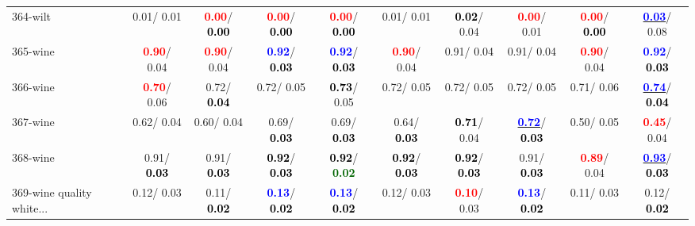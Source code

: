 \begin{table}[h]
\begin{center}
{\begin{tabular}{lc|c|c|c|c|c|c|c|c}
364-wilt &   0.01/  0.01 & \textcolor{red}{\textbf{  0.00}}/\textcolor{black}{\textbf{  0.00}} & \textcolor{red}{\textbf{  0.00}}/\textcolor{black}{\textbf{  0.00}} & \textcolor{red}{\textbf{  0.00}}/\textcolor{black}{\textbf{  0.00}} &   0.01/  0.01 & \textcolor{black}{\textbf{  0.02}}/  0.04 & \textcolor{red}{\textbf{  0.00}}/  0.01 & \textcolor{red}{\textbf{  0.00}}/\textcolor{black}{\textbf{  0.00}} & \underline{\textcolor{blue}{\textbf{  0.03}}}/  0.08 \\
365-wine & \textcolor{red}{\textbf{  0.90}}/  0.04 & \textcolor{red}{\textbf{  0.90}}/  0.04 & \textcolor{blue}{\textbf{  0.92}}/\textcolor{black}{\textbf{  0.03}} & \textcolor{blue}{\textbf{  0.92}}/\textcolor{black}{\textbf{  0.03}} & \textcolor{red}{\textbf{  0.90}}/  0.04 &   0.91/  0.04 &   0.91/  0.04 & \textcolor{red}{\textbf{  0.90}}/  0.04 & \textcolor{blue}{\textbf{  0.92}}/\textcolor{black}{\textbf{  0.03}} \\
366-wine & \textcolor{red}{\textbf{  0.70}}/  0.06 &   0.72/\textcolor{black}{\textbf{  0.04}} &   0.72/  0.05 & \textcolor{black}{\textbf{  0.73}}/  0.05 &   0.72/  0.05 &   0.72/  0.05 &   0.72/  0.05 &   0.71/  0.06 & \underline{\textcolor{blue}{\textbf{  0.74}}}/\textcolor{black}{\textbf{  0.04}} \\ \hline
367-wine &   0.62/  0.04 &   0.60/  0.04 &   0.69/\textcolor{black}{\textbf{  0.03}} &   0.69/\textcolor{black}{\textbf{  0.03}} &   0.64/\textcolor{black}{\textbf{  0.03}} & \textcolor{black}{\textbf{  0.71}}/  0.04 & \underline{\textcolor{blue}{\textbf{  0.72}}}/\textcolor{black}{\textbf{  0.03}} &   0.50/  0.05 & \textcolor{red}{\textbf{  0.45}}/  0.04 \\
368-wine &   0.91/\textcolor{black}{\textbf{  0.03}} &   0.91/\textcolor{black}{\textbf{  0.03}} & \textcolor{black}{\textbf{  0.92}}/\textcolor{black}{\textbf{  0.03}} & \textcolor{black}{\textbf{  0.92}}/\textcolor{darkgreen}{\textbf{  0.02}} & \textcolor{black}{\textbf{  0.92}}/\textcolor{black}{\textbf{  0.03}} & \textcolor{black}{\textbf{  0.92}}/\textcolor{black}{\textbf{  0.03}} &   0.91/\textcolor{black}{\textbf{  0.03}} & \textcolor{red}{\textbf{  0.89}}/  0.04 & \underline{\textcolor{blue}{\textbf{  0.93}}}/\textcolor{black}{\textbf{  0.03}} \\
369-wine quality white... &   0.12/  0.03 &   0.11/\textcolor{black}{\textbf{  0.02}} & \textcolor{blue}{\textbf{  0.13}}/\textcolor{black}{\textbf{  0.02}} & \textcolor{blue}{\textbf{  0.13}}/\textcolor{black}{\textbf{  0.02}} &   0.12/  0.03 & \textcolor{red}{\textbf{  0.10}}/  0.03 & \textcolor{blue}{\textbf{  0.13}}/\textcolor{black}{\textbf{  0.02}} &   0.11/  0.03 &   0.12/\textcolor{black}{\textbf{  0.02}} \\

\end{tabular}}
\end{center}
\end{table}
